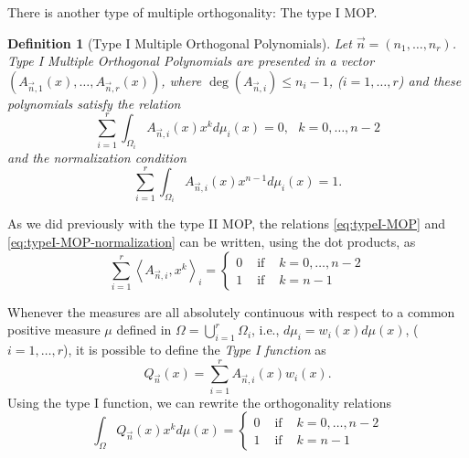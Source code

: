 \documentclass[12pt,a4]{article}
\theoremstyle{plain}
\newtheorem{definition}[theorem]{Definition}
\newcommand{\prodesc}[2]{\left\langle #1 , #2 \right\rangle}
\begin{document}
There is another type of multiple orthogonality: The type I MOP.

\begin{definition}[Type I Multiple Orthogonal Polynomials]
    Let $\vec n = (n_1,\dots,n_r)$. Type I Multiple Orthogonal Polynomials are presented in a vector $(A_{\vec n, 1}(x), \dots, A_{\vec n, r}(x))$, where $\deg(A_{\vec n, i})\leq n_i-1$, ($i=1,\dots,r$) and these polynomials satisfy the relation
    \begin{equation}
        \label{eq:typeI-MOP}
        \sum_{i=1}^r \int_{\Omega_i}A_{\vec n, i}(x) x^k d\mu_i(x) = 0,  \ \ \ k=0,\dots,n-2
    \end{equation}
    and the normalization condition
    \begin{equation}
        \label{eq:typeI-MOP-normalization}
        \sum_{i=1}^r \int_{\Omega_i}A_{\vec n, i}(x) x^{n-1} d\mu_i(x) = 1.
    \end{equation}
    
\end{definition}

As we did previously with the type II MOP, the relations \eqref{eq:typeI-MOP} and \eqref{eq:typeI-MOP-normalization} can be written, using the dot products, as
\begin{equation}
    \sum_{i=1}^r \prodesc{A_{\vec n,i}}{x^k}_i = \left\{\begin{array}{ccl}
        0 &   \text{ if } & k=0,\dots,n-2 \\
        1 & \text{ if } & k=n-1      
    \end{array}\right.
\end{equation}

Whenever the measures are all absolutely continuous with respect to a common positive measure $\mu$ defined in $\Omega = \displaystyle\bigcup_{i=1}^r \Omega_i$, i.e., $d\mu_i = w_i(x) d\mu(x)$, ($i=1,\dots,r$), it is possible to define the \textit{Type I function} as
\begin{equation}
    \label{eq:typeI-function}
    Q_{\vec n}(x)=\sum_{i=1}^r A_{\vec n,i}(x)w_i(x).
\end{equation}
Using the type I function, we can rewrite the orthogonality relations
\begin{equation}
    \int_\Omega Q_{\vec n}(x) x^k d\mu(x) = \left\{\begin{array}{ccl}
        0 &   \text{ if } & k=0,\dots,n-2 \\
        1 & \text{ if } & k=n-1      
    \end{array}\right.
\end{equation}
\end{document}
